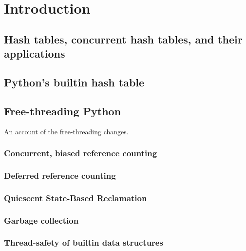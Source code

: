 \chapter{Introduction}

\section{Hash tables, concurrent hash tables, and their applications}

\cite{art-mp}

\section{Python's builtin hash table}

\cite{hettinger-dict}
\cite{dict-notes}
\cite{dict-comment-design}
\cite{dict-comment-hash}

\section{Free-threading Python}

An account of the free-threading changes.

\cite{dabeaz-gil}
\cite{gross-doc}
\cite{mimalloc}

\subsection{Concurrent, biased reference counting}

\cite{biased-refcounting}

\subsection{Deferred reference counting}

\cite{deferred-refcounting}

\subsection{Quiescent State-Based Reclamation}

\cite{qsbr}

\subsection{Garbage collection}

\cite{pep703}

\subsection{Thread-safety of builtin data structures}

\cite[\S Container Thread-Safety]{pep703}
